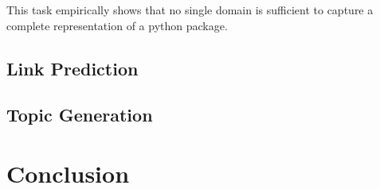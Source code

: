 \documentclass{article}
\begin{document}
This task empirically shows that no single domain is sufficient to capture a complete representation of a python package.

\subsection{Link Prediction}

\subsection{Topic Generation}

\section{Conclusion}





\nocite{doc2vec}



\end{document}
